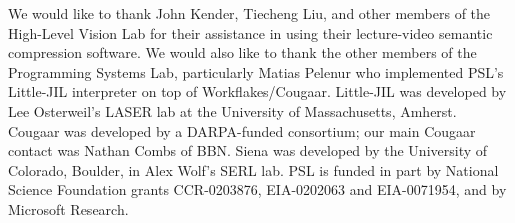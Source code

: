 \documentclass{sig-alternate}
\begin{document}
We would like to thank John Kender, Tiecheng Liu, and other members of
the High-Level Vision Lab for their assistance in using their
lecture-video semantic compression software.  We would also like to
thank the other members of the Programming Systems Lab, particularly
Matias Pelenur who implemented PSL's Little-JIL interpreter on top of
Workflakes/Cougaar.  Little-JIL was developed by Lee Osterweil's LASER
lab at the University of Massachusetts, Amherst. Cougaar was developed
by a DARPA-funded consortium; our main Cougaar contact was Nathan
Combs of BBN.  Siena was developed by the University of Colorado,
Boulder, in Alex Wolf's SERL lab. PSL is funded in part by National
Science Foundation grants CCR-0203876, EIA-0202063 and EIA-0071954,
and by Microsoft Research.

 

% 


\balancecolumns %
\end{document}

